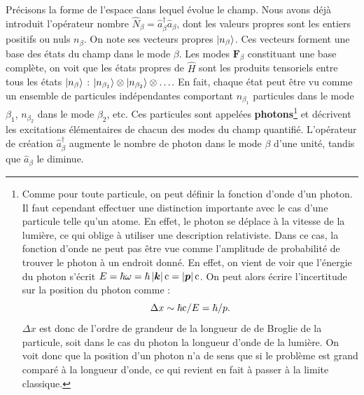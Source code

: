 Précisons la forme de l'espace dans lequel évolue le champ. Nous avons déjà introduit l'opérateur nombre $\hat{N}_{\beta}=\hat{a}^{\dag}_{\beta}\hat{a}_{\beta}$, dont les valeurs propres sont les entiers positifs ou nuls $n_{\beta}$. On note ses vecteurs propres $\ket{n_{\beta}}$. Ces vecteurs forment une base des états du champ dans le mode ${\beta}$. Les modes $\bm{F}_{\beta}$ constituant une base complète, on voit que les états propres de $\hat{H}$ sont les produits tensoriels entre tous les états $\ket{n_{\beta}}$ : $\ket{n_{\beta_1}}\otimes\ket{n_{\beta_2}}\otimes\ldots$. En fait, chaque état peut être vu comme un ensemble de particules indépendantes comportant $n_{\beta_1}$ particules dans le mode ${\beta_1}$, $n_{\beta_2}$ dans le mode ${\beta_2}$, etc. Ces particules sont appelées \textbf{photons}\footnote{Comme pour toute particule, on peut définir la fonction d'onde d'un photon. Il faut cependant effectuer une distinction importante avec le cas d'une particule telle qu'un atome. En effet, le photon se déplace à la vitesse de la lumière, ce qui oblige à utiliser une description relativiste. Dans ce cas, la fonction d'onde ne peut pas être vue comme l'amplitude de probabilité de trouver le photon à un endroit donné. En effet, on vient de voir que l'énergie du photon s'écrit $E = \hbar\omega = \hbar\left|\bm{k}\right|\mathrm{c}=\left|\bm{p}\right|\mathrm{c}$. On peut alors écrire l'incertitude sur la position du photon comme :
\begin{equation}
\Delta x \sim \hbar\mathrm{c}/E = \hbar/p.
\end{equation}
$\Delta x$ est donc de l'ordre de grandeur de la longueur de de Broglie de la particule, soit dans le cas du photon la longueur d'onde de la lumière. On voit donc que la position d'un photon n'a de sens que si le problème est grand comparé à la longueur d'onde, ce qui revient en fait à passer à la limite classique.} et décrivent les excitations élémentaires de chacun des modes du champ quantifié. L'opérateur de création $\hat{a}^{\dag}_{\beta}$ augmente le nombre de photon dans le mode ${\beta}$ d'une unité, tandis que $\hat{a}_{\beta}$ le diminue.

